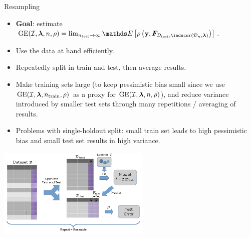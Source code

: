 \begin{vbframe}{Resampling}

\begin{footnotesize}
\begin{itemize}
  \item \textbf{Goal}: estimate $\GEfull[n] =
  \lim_{\ntest \rightarrow \infty} \E \left[ \rho \left(
  \yv, \F_{\Dtest, \inducer(\D_n, \lamv)} 
  \right)\right]$.
   \item Use the data at hand efficiently.
   \item Repeatedly split in train and test, then average results.
  \item Make training sets large (to keep pessimistic bias small since we use 
  $\GEfull$ as a proxy for $\GEfull[n]$),
  and reduce variance introduced by smaller test sets through many repetitions / 
  averaging of results.
  \item Problems with single-holdout split: small train set leads to high 
  pessimistic bias and small test set results in high variance.
\end{itemize}
\end{footnotesize}

\begin{center}
\includegraphics[width=0.55\textwidth]{figure_man/resampling_error.pdf}
\end{center}

\end{vbframe}


